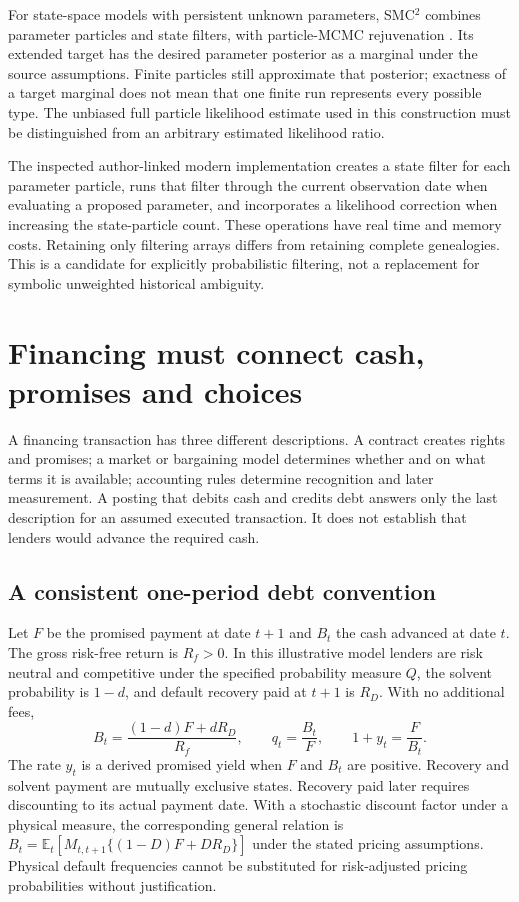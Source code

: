 \documentclass[11pt,a4paper]{article}
\newcommand{\E}{\mathbb E}
\begin{document}
For state-space models with persistent unknown parameters, SMC$^2$ combines
parameter particles and state filters, with particle-MCMC rejuvenation
\cite[Section~3.2, equation~(7), Proposition~1, Appendix~A]{smc2}. Its
extended target has the desired parameter posterior as a marginal under the
source assumptions. Finite particles still approximate that posterior; exactness
of a target marginal does not mean that one finite run represents every
possible type. The unbiased full particle likelihood estimate used in this
construction must be distinguished from an arbitrary estimated likelihood
ratio.

The inspected author-linked modern implementation creates a state filter for
each parameter particle, runs that filter through the current observation date
when evaluating a proposed parameter, and incorporates a likelihood correction
when increasing the state-particle count. These operations have real time and
memory costs. Retaining only filtering arrays differs from retaining complete
genealogies. This is a candidate for explicitly probabilistic filtering, not
a replacement for symbolic unweighted historical ambiguity.

\section{Financing must connect cash, promises and choices}
A financing transaction has three different descriptions. A contract creates
rights and promises; a market or bargaining model determines whether and on
what terms it is available; accounting rules determine recognition and later
measurement. A posting that debits cash and credits debt answers only the
last description for an assumed executed transaction. It does not establish
that lenders would advance the required cash.

\subsection{A consistent one-period debt convention}
Let $F$ be the promised payment at date $t+1$ and $B_t$ the cash advanced at
date $t$. The gross risk-free return is $R_f>0$. In this illustrative model
lenders are risk neutral and competitive under the specified probability
measure $Q$, the solvent probability is $1-d$, and default recovery paid at
$t+1$ is $R_D$. With no additional fees,
\begin{equation}\label{eq:debt}
B_t=\frac{(1-d)F+dR_D}{R_f},\qquad
q_t=\frac{B_t}{F},\qquad 1+y_t=\frac{F}{B_t}.
\end{equation}
The rate $y_t$ is a derived promised yield when $F$ and $B_t$ are positive.
Recovery and solvent payment are mutually exclusive states. Recovery paid
later requires discounting to its actual payment date. With a stochastic
discount factor under a physical measure, the corresponding general relation
is $B_t=\E_t[M_{t,t+1}\{(1-D)F+DR_D\}]$ under the stated pricing
assumptions. Physical default frequencies cannot be substituted for
risk-adjusted pricing probabilities without justification.
\end{document}
